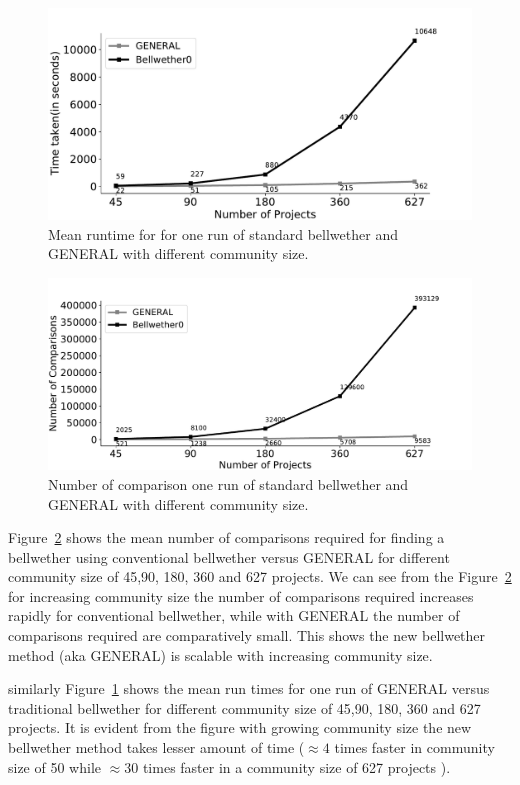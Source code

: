 \documentclass[10pt,journal,compsoc]{IEEEtran}
\newcommand{\fig}[1]{Figure~\ref{fig:#1}}
\begin{document}
\begin{figure}[!b]
    \centering
    \includegraphics[width=\linewidth]{figs/Time_Compare.pdf}
    \caption{Mean runtime for for one run of standard bellwether and GENERAL with different community size.}
    \label{fig:compare_time}
\end{figure}

\begin{figure}[!b]
    \centering
    \includegraphics[width=\linewidth]{figs/compare.pdf}
    \caption{Number of comparison one run of standard bellwether and GENERAL with different community size.}
    \label{fig:compare}
\end{figure}

\fig{compare} shows the mean number of comparisons required for finding a bellwether using conventional bellwether versus GENERAL for different community size of 45,90, 180, 360 and 627 projects. We can see from the \fig{compare} for increasing community size the number of comparisons required increases rapidly for conventional bellwether, while with GENERAL the number of comparisons required are comparatively small. This shows the new bellwether method (aka GENERAL) is scalable with increasing community size.

similarly \fig{compare_time} shows the mean run times for one run of GENERAL versus traditional bellwether for different community size of 45,90, 180, 360 and 627 projects. It is evident from the figure with growing community size the new bellwether method takes lesser amount of time ($\approx 4$ times faster in community size of 50 while $\approx 30$ times faster in a community size of 627 projects ).
\end{document}
